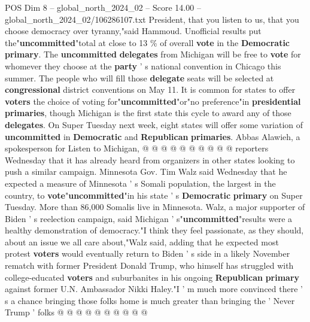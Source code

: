 \begin{textsample}{POS Dim 8 – global\_north\_2024\_02 – Score 14.00 – global\_north\_2024\_02/106286107.txt}
President, that you listen to us, that you choose democracy over tyranny,"said Hammoud.
Unofficial results put the"\textbf{uncommitted}"total at close to 13 \% of overall \textbf{vote} in the \textbf{Democratic} \textbf{primary}.
The \textbf{uncommitted} \textbf{delegates} from Michigan will be free to \textbf{vote} for whomever they choose at the \textbf{party} ' s national convention in Chicago this summer.
The people who will fill those \textbf{delegate} seats will be selected at \textbf{congressional} district conventions on May 11.
It is common for states to offer \textbf{voters} the choice of voting for"\textbf{uncommitted}"or"no preference"in \textbf{presidential} \textbf{primaries}, though Michigan is the first state this cycle to award any of those \textbf{delegates}.
On Super Tuesday next week, eight states will offer some variation of \textbf{uncommitted} in \textbf{Democratic} and \textbf{Republican} \textbf{primaries}.
Abbas Alawieh, a spokesperson for Listen to Michigan, @ @ @ @ @ @ @ @ @ @ reporters Wednesday that it has already heard from organizers in other states looking to push a similar campaign.
Minnesota Gov.
Tim Walz said Wednesday that he expected a measure of Minnesota ' s Somali population, the largest in the country, to \textbf{vote}"\textbf{uncommitted}"in his state ' s \textbf{Democratic} \textbf{primary} on Super Tuesday.
More than 86,000 Somalis live in Minnesota.
Walz, a major supporter of Biden ' s reelection campaign, said Michigan ' s"\textbf{uncommitted}"results were a healthy demonstration of democracy."I think they feel passionate, as they should, about an issue we all care about,"Walz said, adding that he expected most protest \textbf{voters} would eventually return to Biden ' s side in a likely November rematch with former President Donald Trump, who himself has struggled with college-educated \textbf{voters} and suburbanites in his ongoing \textbf{Republican} \textbf{primary} against former U.N.
Ambassador Nikki Haley."I ' m much more convinced there ' s a chance bringing those folks home is much greater than bringing the ' Never Trump ' folks @ @ @ @ @ @ @ @ @ @

\end{textsample}
